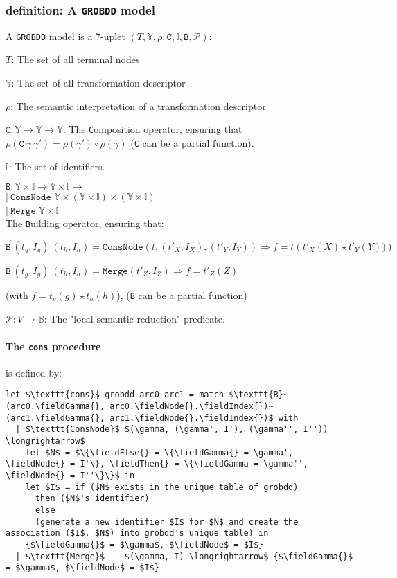 \documentclass[a4paper,10pt]{article}
\newcommand{\B}{\mathbb{B}}
\newcommand{\Y}{\mathbb{Y}}
\newcommand{\I}{\mathbb{I}}
\newcommand{\GroBdd}{\texttt{GROBDD}}
\newcommand{\fieldIndex}{\texttt{index}}
\newcommand{\fieldNode}{\texttt{node}}
\newcommand{\fieldGamma}{\mathtt{\gamma}}
\newcommand{\fieldThen}{\mathtt{if1}}
\newcommand{\fieldElse}{\mathtt{if0}}
\begin{document}
\subsubsection{definition: A \GroBdd{} model}
{
A \GroBdd{} model is a 7-uplet $(T, \Y, \rho, \texttt{C}, \I, \texttt{B}, \mathcal{P})$:
\begin{compactenum}
\item $T$: The set of all terminal nodes
\item $\Y$: The set of all transformation descriptor
\item $\rho$: The semantic interpretation of a transformation descriptor
\item $\texttt{C}: \Y \longrightarrow \Y \longrightarrow \Y$: The \texttt{C}omposition operator, ensuring that $\rho(\texttt{C}~\gamma~\gamma') = \rho(\gamma')\circ\rho(\gamma)$ (\texttt{C} can be a partial function).
\item $\I$: The set of identifiers.
\item $\mathtt{B}: \Y\times\I \longrightarrow \Y\times\I \longrightarrow$\\
 $|~\texttt{ConsNode}$ $\Y\times (\Y\times\I) \times (\Y\times\I)$\\
 $|~\texttt{Merge}$ $\Y\times\I$\\
The \texttt{B}uilding operator, ensuring that:\begin{compactenum}
\item $\texttt{B}~(t_g, I_g)~(t_h, I_h) = \texttt{ConsNode} (t, (t'_X, I_X), (t'_Y, I_Y)) \Rightarrow f = t\left(t'_X(X) \star t'_Y(Y))\right)$
\item $\texttt{B}~(t_g, I_g)~(t_h, I_h) = \texttt{Merge} (t'_Z, I_Z) \Rightarrow f = t'_Z(Z)$
\end{compactenum}
(with $f = t_g(g) \star t_h(h)$), (\texttt{B} can be a partial function)
\item $\mathcal{P}: V\longrightarrow\B$: The "local semantic reduction" predicate.
\end{compactenum}
}

\paragraph{The \texttt{cons} procedure} is defined by:
\begin{lstlisting}
let $\texttt{cons}$ grobdd arc0 arc1 = match $\texttt{B}~(arc0.\fieldGamma{}, arc0.\fieldNode{}.\fieldIndex{})~(arc1.\fieldGamma{}, arc1.\fieldNode{}.\fieldIndex{})$ with
  | $\texttt{ConsNode}$ $(\gamma, (\gamma', I'), (\gamma'', I'')) \longrightarrow$
    let $N$ = $\{\fieldElse{} = \{\fieldGamma{} = \gamma', \fieldNode{} = I'\}, \fieldThen{} = \{\fieldGamma = \gamma'', \fieldNode{} = I''\}\}$ in
    let $I$ = if ($N$ exists in the unique table of grobdd)
      then ($N$'s identifier)
      else
      (generate a new identifier $I$ for $N$ and create the association ($I$, $N$) into grobdd's unique table) in
    {$\fieldGamma{}$ = $\gamma$, $\fieldNode$ = $I$}
  | $\texttt{Merge}$    $(\gamma, I) \longrightarrow$ {$\fieldGamma{}$ = $\gamma$, $\fieldNode$ = $I$}
\end{lstlisting}
\end{document}
